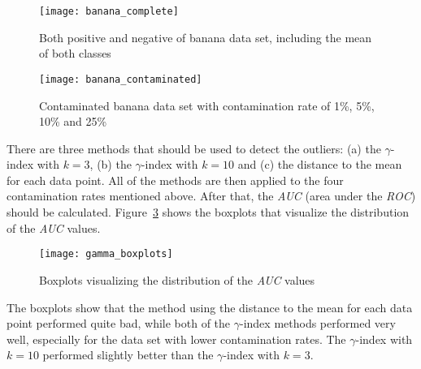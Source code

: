 \begin{figure}[h!]
	\centering
	\texttt{[image: banana\_complete]}
	\caption{Both positive and negative of banana data set, including the mean of both classes}
	\label{fig:bananacomplete}
\end{figure}

\begin{figure}[h!]
	\centering
	\texttt{[image: banana\_contaminated]}
	\caption{Contaminated banana data set with contamination rate of 1\%, 5\%, 10\% and 25\%}
	\label{fig:bananacontaminated}
\end{figure}

There are three methods that should be used to detect the outliers: (a) the $\gamma$-index with $k=3$, (b) the $\gamma$-index with $k=10$ and (c) the distance to the mean for each data point. All of the methods are then applied to the four contamination rates mentioned above. After that, the \textit{AUC} (area under the \textit{ROC}) should be calculated. Figure~\ref{fig:gammaboxplots} shows the boxplots that visualize the distribution of the \textit{AUC} values.

\begin{figure}[h!]
	\centering
	\texttt{[image: gamma\_boxplots]}
	\caption{Boxplots visualizing the distribution of the \textit{AUC} values}
	\label{fig:gammaboxplots}
\end{figure}

The boxplots show that the method using the distance to the mean for each data point performed quite bad, while both of the $\gamma$-index methods performed very well, especially for the data set with lower contamination rates. The $\gamma$-index with $k=10$ performed slightly better than the $\gamma$-index with $k=3$.
